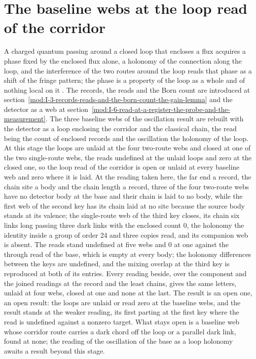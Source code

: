 \section{The baseline webs at the loop read of the corridor}\label{mod:I-3-D539202-w-nupr}
A charged quantum passing around a closed loop that encloses a flux acquires a phase fixed by the enclosed flux alone, a holonomy of the connection along the loop, and the interference of the two routes around the loop reads that phase as a shift of the fringe pattern; the phase is a property of the loop as a whole and of nothing local on it \cite{Aharonov1959,Berry1984}. The records, the reads and the Born count are introduced at section~\ref{mod:I-3-records-reads-and-the-born-count-the-gain-lemma} and the detector as a web at section~\ref{mod:I-6-read-at-a-register-the-probe-and-the-measurement}.
The three baseline webs of the oscillation result are rebuilt with the detector as a loop enclosing the corridor and the classical chain, the read being the count of enclosed records and the oscillation the holonomy of the loop. At this stage the loops are unlaid at the four two-route webs and closed at one of the two single-route webs, the reads undefined at the unlaid loops and zero at the closed one, so the loop read of the corridor is open or unlaid at every baseline web and zero where it is laid.
At the reading taken here, the far end a record, the chain site a body and the chain length a record, three of the four two-route webs have no detector body at the base and their chain is laid to no body, while the first web of the second key has its chain laid at no site because the source body stands at its valence; the single-route web of the third key closes, its chain six links long passing three dark links with the enclosed count 0, the holonomy the identity inside a group of order 24 and three copies read, and its companion web is absent. The reads stand undefined at five webs and 0 at one against the through read of the base, which is empty at every body; the holonomy differences between the keys are undefined, and the mixing overlap at the third key is reproduced at both of its entries. Every reading beside, over the component and the joined readings at the record and the least chains, gives the same letters, unlaid at four webs, closed at one and none at the last.
The result is an open one, an open result: the loops are unlaid or read zero at the baseline webs, and the result stands at the weaker reading, its first parting at the first key where the read is undefined against a nonzero target.
What stays open is a baseline web whose corridor route carries a dark chord off the loop or a parallel dark link, found at none; the reading of the oscillation of the base as a loop holonomy awaits a result beyond this stage.
